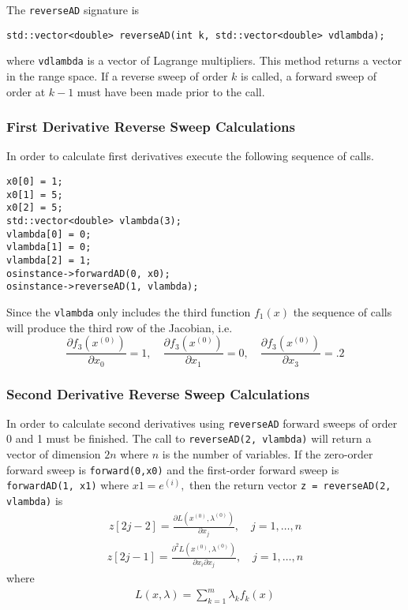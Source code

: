 \documentclass[11pt]{article}
\newcommand{\D}[2]{ \frac{\partial #1}{\partial #2} }
\newcommand{\DD}[3]{ \frac{\partial^2 #1}{\partial #2 \partial #3} }
\renewcommand{\_}{{\char"5F}}
\renewcommand{\{}{{\char"7B}}
\renewcommand{\}}{{\char"7D}}
\renewcommand{\^}{{\char"0D}}
\renewcommand{\'}{{\char"0D}}
\begin{document}
The {\tt reverseAD} signature is
\begin{verbatim}
std::vector<double> reverseAD(int k, std::vector<double> vdlambda);
\end{verbatim}
where {\tt vdlambda} is a vector of Lagrange multipliers.  This method returns a vector in the range space. If a reverse sweep of order $k$ is called, a forward sweep of order at $k -1$ must have been made prior to the call. 

\subsubsection{First Derivative Reverse Sweep Calculations}

In order to calculate first derivatives execute the following sequence of calls. 
\begin{verbatim}
x0[0] = 1;
x0[1] = 5;
x0[2] = 5;
std::vector<double> vlambda(3);
vlambda[0] = 0;
vlambda[1] = 0;
vlambda[2] = 1;
osinstance->forwardAD(0, x0);
osinstance->reverseAD(1, vlambda);
\end{verbatim}
Since the {\tt vlambda} only includes the third function $f_{1}(x)$ the sequence of calls will produce the third row of the Jacobian, i.e.
$$
\D{f_{3}(x^{(0)})}{x_{0}}  = 1,  \quad \D{f_{3}(x^{(0)})}{x_{1}}  = 0, \quad  \D{f_{3}(x^{(0)})}{x_{3}}  = .2 
$$

\subsubsection{Second Derivative Reverse Sweep Calculations}

In order to calculate second derivatives using {\tt reverseAD} forward sweeps of order 0 and 1 must be finished.  The call to {\tt reverseAD(2, vlambda)} will return a vector of dimension $2n$ where $n$ is the number of variables.  If the zero-order forward sweep is {\tt forward(0,x0)} and the first-order forward sweep is {\tt forwardAD(1, x1)} where $x1 = e^{(i)},$ then the return vector {\tt z = reverseAD(2,  vlambda)} is
\begin{eqnarray}
z[2j - 2]  = \D{L (x^{(0)}, \lambda^{(0)})}{x_{j}}, \quad j = 1, \ldots, n
\end{eqnarray}
\begin{eqnarray}
z[2j - 1]  = \DD{L(x^{(0)}, \lambda^{(0)})}{x_{i}}{x_{j}}, \quad j = 1, \ldots, n
\end{eqnarray}
where
\begin{eqnarray}
L (x, \lambda) = \sum_{k = 1}^{m} \lambda_{k} f_{k}(x)
\end{eqnarray}
\end{document}
